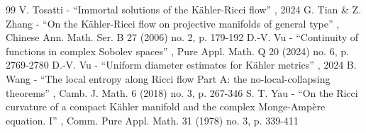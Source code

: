 \documentclass[10pt]{amsart}
\theoremstyle{definition}
\begin{document}
\begin{thebibliography}{99}
 V. Tosatti - “Immortal solutions of the Kähler-Ricci flow” , 2024
 G. Tian \& Z. Zhang - “On the Kähler-Ricci flow on projective manifolds of general type” , Chinese Ann. Math. Ser. B 27 (2006) no. 2, p. 179-192
 D.-V. Vu - “Continuity of functions in complex Sobolev spaces” , Pure Appl. Math. Q 20 (2024) no. 6, p. 2769-2780
 D.-V. Vu - “Uniform diameter estimates for Kähler metrics” , 2024
 B. Wang - “The local entropy along Ricci flow Part A: the no-local-collapsing theorems” , Camb. J. Math. 6 (2018) no. 3, p. 267-346
 S. T. Yau - “On the Ricci curvature of a compact Kähler manifold and the complex Monge-Ampère equation. I” , Comm. Pure Appl. Math. 31 (1978) no. 3, p. 339-411
\end{thebibliography}
\end{document}
